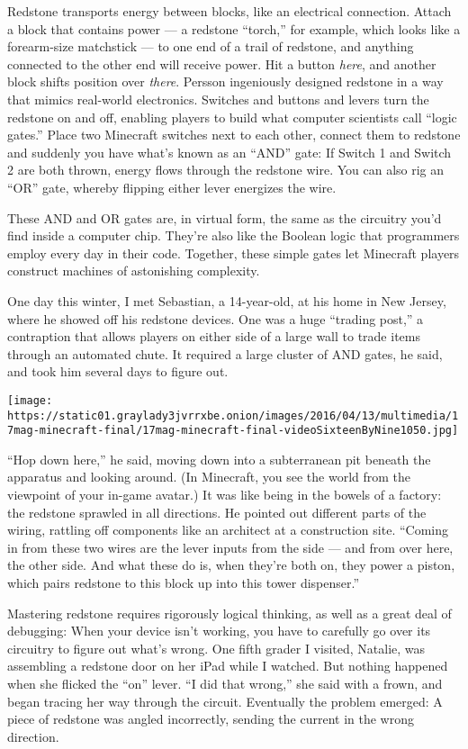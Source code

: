 Redstone transports energy between blocks, like an electrical
connection. Attach a block that contains power --- a redstone ``torch,''
for example, which looks like a forearm-size matchstick --- to one end
of a trail of redstone, and anything connected to the other end will
receive power. Hit a button \emph{here}, and another block shifts
position over \emph{there}. Persson ingeniously designed redstone in a
way that mimics real-world electronics. Switches and buttons and levers
turn the redstone on and off, enabling players to build what computer
scientists call ``logic gates.'' Place two Minecraft switches next to
each other, connect them to redstone and suddenly you have what's known
as an ``AND'' gate: If Switch 1 and Switch 2 are both thrown, energy
flows through the redstone wire. You can also rig an ``OR'' gate,
whereby flipping either lever energizes the wire.

These AND and OR gates are, in virtual form, the same as the circuitry
you'd find inside a computer chip. They're also like the Boolean logic
that programmers employ every day in their code. Together, these simple
gates let Minecraft players construct machines of astonishing
complexity.

One day this winter, I met Sebastian, a 14-year-old, at his home in New
Jersey, where he showed off his redstone devices. One was a huge
``trading post,'' a contraption that allows players on either side of a
large wall to trade items through an automated chute. It required a
large cluster of AND gates, he said, and took him several days to figure
out.

\texttt{[image: https://static01.graylady3jvrrxbe.onion/images/2016/04/13/multimedia/17mag-minecraft-final/17mag-minecraft-final-videoSixteenByNine1050.jpg]}

``Hop down here,'' he said, moving down into a subterranean pit beneath
the apparatus and looking around. (In Minecraft, you see the world from
the viewpoint of your in-game avatar.) It was like being in the bowels
of a factory: the redstone sprawled in all directions. He pointed out
different parts of the wiring, rattling off components like an architect
at a construction site. ``Coming in from these two wires are the lever
inputs from the side --- and from over here, the other side. And what
these do is, when they're both on, they power a piston, which pairs
redstone to this block up into this tower dispenser.''

Mastering redstone requires rigorously logical thinking, as well as a
great deal of debugging: When your device isn't working, you have to
carefully go over its circuitry to figure out what's wrong. One fifth
­grader I visited, Natalie, was assembling a redstone door on her iPad
while I watched. But nothing happened when she flicked the ``on'' lever.
``I did that wrong,'' she said with a frown, and began tracing her way
through the circuit. Eventually the problem emerged: A piece of redstone
was angled incorrectly, sending the current in the wrong direction.

